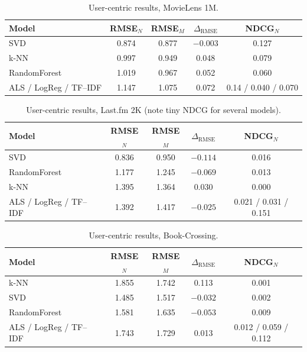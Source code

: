 \documentclass[11pt,a4paper,twoside,openright]{report}
\begin{document}
\begin{table}[htbp]
  \centering
  \caption{User-centric results, MovieLens 1M.}
  \label{tab:fairml1m}
  \begin{tabular}{lcccc}
    \toprule
    Model & RMSE$_N$ & RMSE$_M$ & $\Delta_{\mathrm{RMSE}}$ & NDCG$_N$ \\
    \midrule
    SVD & 0.874 & 0.877 & $-0.003$ & 0.127 \\
    k-NN & 0.997 & 0.949 & 0.048 & 0.079 \\
    RandomForest & 1.019 & 0.967 & 0.052 & 0.060 \\
    ALS / LogReg / TF--IDF & 1.147 & 1.075 & 0.072 & 0.14 / 0.040 / 0.070 \\
    \bottomrule
  \end{tabular}
\end{table}

\begin{table}[htbp]
  \centering
  \caption{User-centric results, Last.fm 2K (note tiny NDCG for several models).}
  \label{tab:fairlastfm}
  \begin{tabular}{lcccc}
    \toprule
    Model & RMSE$_N$ & RMSE$_M$ & $\Delta_{\mathrm{RMSE}}$ & NDCG$_N$ \\
    \midrule
    SVD & 0.836 & 0.950 & $-0.114$ & 0.016 \\
    RandomForest & 1.177 & 1.245 & $-0.069$ & 0.013 \\
    k-NN & 1.395 & 1.364 & 0.030 & 0.000 \\
    ALS / LogReg / TF--IDF & 1.392 & 1.417 & $-0.025$ & 0.021 / 0.031 / 0.151 \\
    \bottomrule
  \end{tabular}
\end{table}

\begin{table}[htbp]
  \centering
  \caption{User-centric results, Book-Crossing.}
  \label{tab:fairbx}
  \begin{tabular}{lcccc}
    \toprule
    Model & RMSE$_N$ & RMSE$_M$ & $\Delta_{\mathrm{RMSE}}$ & NDCG$_N$ \\
    \midrule
    k-NN & 1.855 & 1.742 & 0.113 & 0.001 \\
    SVD & 1.485 & 1.517 & $-0.032$ & 0.002 \\
    RandomForest & 1.581 & 1.635 & $-0.053$ & 0.009 \\
    ALS / LogReg / TF--IDF & 1.743 & 1.729 & 0.013 & 0.012 / 0.059 / 0.112 \\
    \bottomrule
  \end{tabular}
\end{table}
\end{document}
